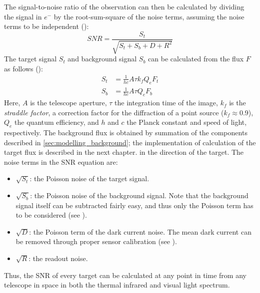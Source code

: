 The signal-to-noise ratio of the observation can then be calculated by dividing the signal in $e^-$ by the root-sum-square of the noise terms, assuming the noise terms to be independent (\cite{DetectionAndTracking}):
\begin{equation}
 SNR = \frac{S_t}{\sqrt{S_t + S_b + D + R^2}}
\end{equation}
The target signal $S_t$ and background signal $S_b$ can be calculated from the flux $F$ as follows (\cite{DetectionAndTracking}):
\begin{align}
 S_t &= \frac{1}{hc}A \tau k_f Q_e F_t \\
 S_b &= \frac{1}{hc}A \tau Q_e F_b
\end{align}
Here, $A$ is the telescope aperture, $\tau$ the integration time of the image, $k_f$ is the \textit{straddle factor}, a correction factor for the diffraction of a point source ($k_f \approx 0.9$), $Q_e$ the quantum efficiency, and $h$ and $c$ the Planck constant and speed of light, respectively. The background flux is obtained by summation of the components described in \autoref{sec:modelling_background}; the implementation of calculation of the target flux is described in the next chapter. in the direction of the target. The noise terms in the SNR equation are:
\begin{itemize}
 \item $\sqrt{S_t}$: the Poisson noise of the target signal.
 \item $\sqrt{S_b}$: the Poisson noise of the background signal. Note that the background signal itself can be subtracted fairly easy, and thus only the Poisson term has to be considered (see \cite{StarRemoval}).
 \item $\sqrt{D}$: the Poisson term of the dark current noise. The mean dark current can be removed through proper sensor calibration (see \cite{OpNav}).
 \item $\sqrt{R}$: the readout noise.
\end{itemize}

Thus, the SNR of every target can be calculated at any point in time from any telescope in space in both the thermal infrared and visual light spectrum.

